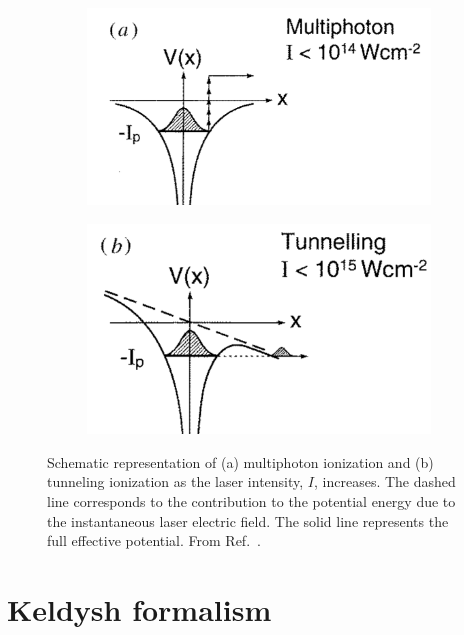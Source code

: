 \begin{figure}
  \centering
  \begin{subfigure}[b]{0.5\linewidth}
    \includegraphics[width=\textwidth]{figures/ch_ATI_SFA/multiphoton}
  \end{subfigure}
  \centering
  \begin{subfigure}[b]{0.46\linewidth}
    \includegraphics[width=\textwidth]{figures/ch_ATI_SFA/tunneling}
  \end{subfigure}  
  \caption{Schematic representation of (a) multiphoton ionization and
    (b) tunneling ionization as the laser intensity, $I$,
    increases. The dashed line corresponds to the contribution to the
    potential energy due to the instantaneous laser electric
    field. The solid line represents the full effective
    potential. From Ref.~\cite{Protopapas_mpi_tunneling}.}
  \label{fig:mpi_tunneling}
\end{figure}


\section{\label{sec:keldysh} Keldysh formalism}

